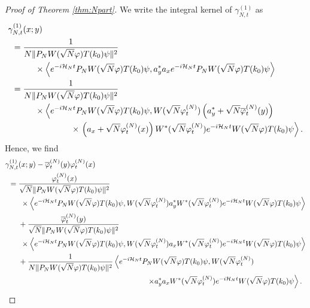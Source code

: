 \documentclass[11pt,a4paper]{article}
\newcommand{\cH}{{\cal H}}
\newcommand{\ph}{\varphi_t^{(N)}}	%
\begin{document}
 \begin{proof}[Proof of Theorem \ref{thm:Npart}]
We write the integral kernel of $\gamma^{(1)}_{N,t}$ as
\[ \begin{split} \gamma^{(1)}_{N,t} &(x;y) \\ = \; &\frac{1}{N \| P_N W(\sqrt{N} \varphi) T(k_0) \psi \|^2} \\ & \hspace{.5cm} \times \left\langle  
e^{-i\cH_N t}  P_N W(\sqrt{N} \varphi) T(k_0) \psi , a_y^* a_x  e^{-i\cH_N t}  P_N W(\sqrt{N} \varphi) T(k_0) \psi \right\rangle \\  = \; & \frac{1}{N \| P_N W(\sqrt{N} \varphi) T(k_0) \psi \|^2} \\ & \hspace{.5cm}  \times \left\langle  
e^{-i\cH_N t}  P_N W(\sqrt{N} \varphi) T(k_0) \psi , W (\sqrt{N} \varphi_t^{(N)}) \left(a_y^* + \sqrt{N} \overline{\varphi}_t^{(N)} (y) \right) \right. \\  & \hspace{2cm} \times \left. \left( a_x + \sqrt{N} \varphi_t^{(N)} (x)\right) W^*(\sqrt{N} \varphi_t^{(N)})  e^{-i\cH_N t}  W(\sqrt{N} \varphi) T(k_0) \psi \right\rangle. \end{split} \]
Hence, we find
\[ \begin{split} 
 \gamma^{(1)}_{N,t} &(x;y) - \overline{\varphi}_t^{(N)} (y)\varphi_t^{(N)} (x) \\  = \; & \frac{\ph (x)}{\sqrt{N} \| P_N W(\sqrt{N} \varphi) T(k_0) \psi \|^2} 
\\ & \hspace{.1cm}  \times \left\langle  
e^{-i\cH_N t}  P_N W(\sqrt{N} \varphi) T(k_0) \psi , W (\sqrt{N} \varphi_t^{(N)}) a_y^* W^*(\sqrt{N} \varphi_t^{(N)} ) e^{-i\cH_N t}  W(\sqrt{N} \varphi) T(k_0) \psi \right\rangle \\ &+ \frac{\overline{\varphi}_t^{(N)} (y)}{\sqrt{N} \| P_N W(\sqrt{N} \varphi) T(k_0) \psi \|^2} \\ & \hspace{.1cm}  \times \left\langle  
e^{-i\cH_N t}  P_N W(\sqrt{N} \varphi) T(k_0) \psi , W (\sqrt{N} \varphi_t^{(N)}) a_x W^*(\sqrt{N} \varphi_t^{(N)} ) e^{-i\cH_N t}  W(\sqrt{N} \varphi) T(k_0) \psi \right\rangle\\ &+ \frac{1}{N \| P_N W(\sqrt{N} \varphi) T(k_0) \psi \|^2} \left\langle  e^{-i\cH_N t}  P_N W(\sqrt{N} \varphi) T(k_0) \psi , W (\sqrt{N} \varphi_t^{(N)}) \right. \\ & \left. \hspace{6cm}  \times  a^*_y a_x W^*(\sqrt{N} \varphi_t^{(N)})  e^{-i\cH_N t}  W(\sqrt{N} \varphi) T(k_0) \psi \right\rangle. 

\end{split}\]
\end{proof}
\end{document}
